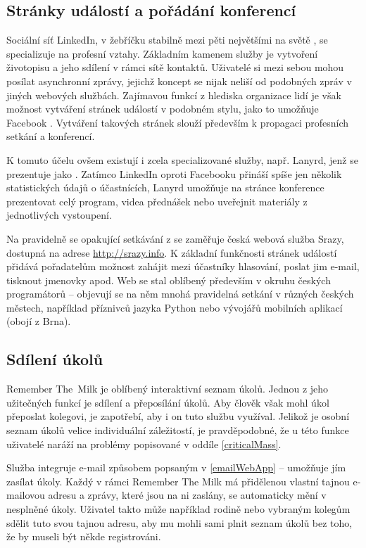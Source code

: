 \documentclass[12pt,oneside,final]{fithesis2}
\begin{document}
\subsection{Stránky událostí a pořádání konferencí}
Sociální síť LinkedIn, v žebříčku stabilně mezi pěti největšími na světě \cite{kazeniac2009social}, se specializuje na profesní vztahy. Základním kamenem služby je vytvoření životopisu a jeho sdílení v rámci sítě kontaktů. Uživatelé si mezi sebou mohou posílat asynchronní zprávy, jejichž koncept se nijak neliší od podobných zpráv v jiných webových službách. Zajímavou funkcí z hlediska organizace lidí je však možnost vytváření stránek událostí v podobném stylu, jako to umožňuje Facebook \cite{linkedin2011networking}. Vytváření takových stránek slouží především k propagaci profesních setkání a konferencí.

K tomuto účelu ovšem existují i zcela specializované služby, např. Lanyrd, jenž se prezentuje jako . Zatímco LinkedIn oproti Facebooku přináší spíše jen několik statistických údajů o účastnících, Lanyrd umožňuje na stránce konference prezentovat celý program, videa přednášek nebo uveřejnit materiály z jednotlivých vystoupení.

Na pravidelně se opakující setkávání z se zaměřuje česká webová služba Srazy, dostupná na adrese \url{http://srazy.info}. K základní funkčnosti stránek událostí přidává pořadatelům možnost zahájit mezi účastníky hlasování, poslat jim e-mail, tisknout jmenovky apod. Web se stal oblíbený především v okruhu českých programátorů -- objevují se na něm mnohá pravidelná setkání v různých českých městech, například příznivců jazyka Python nebo vývojářů mobilních aplikací (obojí z Brna).

\subsection{Sdílení úkolů}
Remember The~Milk je oblíbený interaktivní seznam úkolů. Jednou z jeho užitečných funkcí je sdílení a přeposílání úkolů. Aby člověk však mohl úkol přeposlat kolegovi, je zapotřebí, aby i on tuto službu využíval. Jelikož je osobní seznam úkolů velice individuální záležitostí, je pravděpodobné, že u této funkce uživatelé naráží na problémy popisované v oddíle \ref{criticalMass}.

Služba integruje e-mail způsobem popsaným v \ref{emailWebApp} -- umožňuje jím zasílat úkoly. Každý v rámci Remember The Milk má přidělenou vlastní tajnou e-mailovou adresu a zprávy, které jsou na ni zaslány, se automaticky mění v nesplněné úkoly. Uživatel takto může například rodině nebo vybraným kolegům sdělit tuto svou tajnou adresu, aby mu mohli sami plnit seznam úkolů bez toho, že by museli být někde registrováni.
\end{document}
